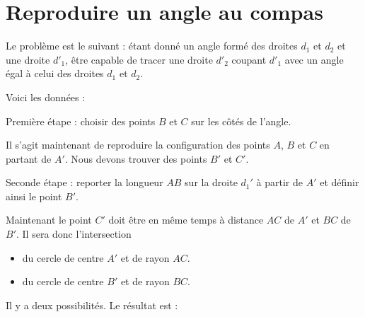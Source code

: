 \section{Reproduire un angle au compas}

Le problème est le suivant : étant donné un angle formé des droites \( d_1\) et \( d_2\) et une droite \( d'_1\), être capable de tracer une droite \( d'_2\) coupant \( d'_1\) avec un angle égal à celui des droites \( d_1\) et \( d_2\).



Voici les données :

\begin{center}
   
\end{center}


Première étape : choisir des points \( B\) et \( C\) sur les côtés de l'angle.

\begin{center}
   
\end{center}

Il s'agit maintenant de reproduire la configuration des points \( A\), \( B\) et \( C\) en partant de \( A'\). Nous devons trouver des points \( B'\) et \( C'\).

Seconde étape : reporter la longueur \( AB\) sur la droite \( d_1'\) à partir de \( A'\) et définir ainsi le point \( B'\).

\begin{center}
   
\end{center}

Maintenant le point \( C'\) doit être en même temps à distance \( AC\) de \( A'\) et \( BC\) de \( B'\). Il sera donc l'intersection
\begin{itemize}
    \item 
        du cercle de centre \( A'\) et de rayon \( AC\).
    \item
        du cercle de centre \( B'\) et de rayon \( BC\).
\end{itemize}

\begin{center}
   
\end{center}

Il y a deux possibilités. Le résultat est :
\begin{center}
   
\end{center}


